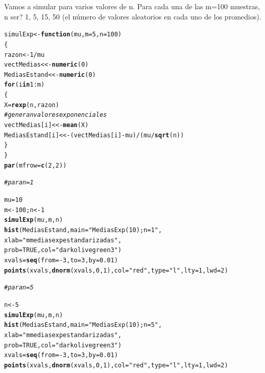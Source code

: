 \documentclass[12pt,letterpaper]{article}\usepackage[]{graphicx}\usepackage[]{color}
\makeatletter
\newcommand{\hlnum}[1]{\textcolor[rgb]{0.686,0.059,0.569}{#1}}%
\newcommand{\hlstr}[1]{\textcolor[rgb]{0.192,0.494,0.8}{#1}}%
\newcommand{\hlcom}[1]{\textcolor[rgb]{0.678,0.584,0.686}{\textit{#1}}}%
\newcommand{\hlopt}[1]{\textcolor[rgb]{0,0,0}{#1}}%
\newcommand{\hlstd}[1]{\textcolor[rgb]{0.345,0.345,0.345}{#1}}%
\newcommand{\hlkwa}[1]{\textcolor[rgb]{0.161,0.373,0.58}{\textbf{#1}}}%
\newcommand{\hlkwb}[1]{\textcolor[rgb]{0.69,0.353,0.396}{#1}}%
\newcommand{\hlkwc}[1]{\textcolor[rgb]{0.333,0.667,0.333}{#1}}%
\newcommand{\hlkwd}[1]{\textcolor[rgb]{0.737,0.353,0.396}{\textbf{#1}}}%
\newenvironment{kframe}{%
 \def\at@end@of@kframe{}%
 \ifinner\ifhmode%
  \def\at@end@of@kframe{\end{minipage}}%
  \begin{minipage}{\columnwidth}%
 \fi\fi%
 \def\FrameCommand##1{\hskip\@totalleftmargin \hskip-\fboxsep
 \colorbox{shadecolor}{##1}\hskip-\fboxsep
     \hskip-\linewidth \hskip-\@totalleftmargin \hskip\columnwidth}%
 \MakeFramed {\advance\hsize-\width
   \@totalleftmargin\z@ \linewidth\hsize
   \@setminipage}}%
 {\par\unskip\endMakeFramed%
 \at@end@of@kframe}
\newenvironment{knitrout}{}{} %
\makeatother
\begin{document}
\begin{enumerate}
Vamos a simular para varios valores de n. Para cada una de las m=100 muestras, n ser? 1, 5, 15, 50 (el n\'umero de valores aleatorios en cada uno de los promedios).
\begin{knitrout}
\color{fgcolor}\begin{kframe}
\begin{alltt}
\hlstd{simulExp} \hlkwb{<-} \hlkwa{function}\hlstd{(}\hlkwc{mu}\hlstd{,} \hlkwc{m}\hlstd{=}\hlnum{5}\hlstd{,} \hlkwc{n}\hlstd{=}\hlnum{100}\hlstd{)}
\hlstd{\{}
\hlstd{razon} \hlkwb{<-} \hlnum{1}\hlopt{/}\hlstd{mu}
\hlstd{vectMedias} \hlkwb{<<-} \hlkwd{numeric}\hlstd{(}\hlnum{0}\hlstd{)}
\hlstd{MediasEstand} \hlkwb{<<-} \hlkwd{numeric}\hlstd{(}\hlnum{0}\hlstd{)}
\hlkwa{for} \hlstd{(i} \hlkwa{in} \hlnum{1}\hlopt{:}\hlstd{m)}
\hlstd{\{}
\hlstd{X} \hlkwb{=} \hlkwd{rexp}\hlstd{(n, razon)}
\hlcom{# genera n valores exponenciales }
\hlstd{vectMedias[i]} \hlkwb{<<-} \hlkwd{mean}\hlstd{(X)}
\hlstd{MediasEstand[i]} \hlkwb{<<-} \hlstd{(vectMedias[i]} \hlopt{-} \hlstd{mu)}\hlopt{/}\hlstd{(mu}\hlopt{/}\hlkwd{sqrt}\hlstd{(n))}
 \hlstd{\}}
\hlstd{\}}
\hlkwd{par}\hlstd{(}\hlkwc{mfrow}\hlstd{=}\hlkwd{c}\hlstd{(}\hlnum{2}\hlstd{,}\hlnum{2}\hlstd{))}

\hlcom{# para n=1 }

\hlstd{mu}\hlkwb{=}\hlnum{10}
\hlstd{m} \hlkwb{<-} \hlnum{100}\hlstd{; n} \hlkwb{<-} \hlnum{1}
\hlkwd{simulExp}\hlstd{(mu, m, n)}
\hlkwd{hist}\hlstd{(MediasEstand,} \hlkwc{main}\hlstd{=}\hlstr{"Medias Exp(10); n=1"}\hlstd{,}
     \hlkwc{xlab}\hlstd{=}\hlstr{"m medias exp estandarizadas"}\hlstd{,}
\hlkwc{prob}\hlstd{=}\hlnum{TRUE}\hlstd{,} \hlkwc{col}\hlstd{=}\hlstr{"darkolivegreen3"}\hlstd{)}
\hlstd{xvals} \hlkwb{=} \hlkwd{seq}\hlstd{(}\hlkwc{from}\hlstd{=}\hlopt{-}\hlnum{3}\hlstd{,} \hlkwc{to}\hlstd{=}\hlnum{3}\hlstd{,} \hlkwc{by}\hlstd{=}\hlnum{0.01}\hlstd{)}
\hlkwd{points}\hlstd{(xvals,} \hlkwd{dnorm}\hlstd{(xvals,} \hlnum{0}\hlstd{,} \hlnum{1}\hlstd{),} \hlkwc{col} \hlstd{=} \hlstr{"red"}\hlstd{,} \hlkwc{type}\hlstd{=}\hlstr{"l"}\hlstd{,} \hlkwc{lty}\hlstd{=}\hlnum{1}\hlstd{,} \hlkwc{lwd}\hlstd{=}\hlnum{2}\hlstd{)}

\hlcom{# para n=5}

\hlstd{n} \hlkwb{<-} \hlnum{5}
\hlkwd{simulExp}\hlstd{(mu, m, n)}
\hlkwd{hist}\hlstd{(MediasEstand,} \hlkwc{main}\hlstd{=}\hlstr{"Medias Exp(10); n=5"}\hlstd{,}
     \hlkwc{xlab}\hlstd{=}\hlstr{"m medias exp estandarizadas"}\hlstd{,}
\hlkwc{prob}\hlstd{=}\hlnum{TRUE}\hlstd{,} \hlkwc{col}\hlstd{=}\hlstr{"darkolivegreen3"}\hlstd{)}
\hlstd{xvals} \hlkwb{=} \hlkwd{seq}\hlstd{(}\hlkwc{from}\hlstd{=}\hlopt{-}\hlnum{3}\hlstd{,} \hlkwc{to}\hlstd{=}\hlnum{3}\hlstd{,} \hlkwc{by}\hlstd{=}\hlnum{0.01}\hlstd{)}
\hlkwd{points}\hlstd{(xvals,} \hlkwd{dnorm}\hlstd{(xvals,} \hlnum{0}\hlstd{,} \hlnum{1}\hlstd{),} \hlkwc{col} \hlstd{=} \hlstr{"red"}\hlstd{,} \hlkwc{type}\hlstd{=}\hlstr{"l"}\hlstd{,} \hlkwc{lty}\hlstd{=}\hlnum{1}\hlstd{,} \hlkwc{lwd}\hlstd{=}\hlnum{2}\hlstd{)}


\end{alltt}
\end{kframe}
\end{knitrout}
\end{enumerate}
\end{document}
